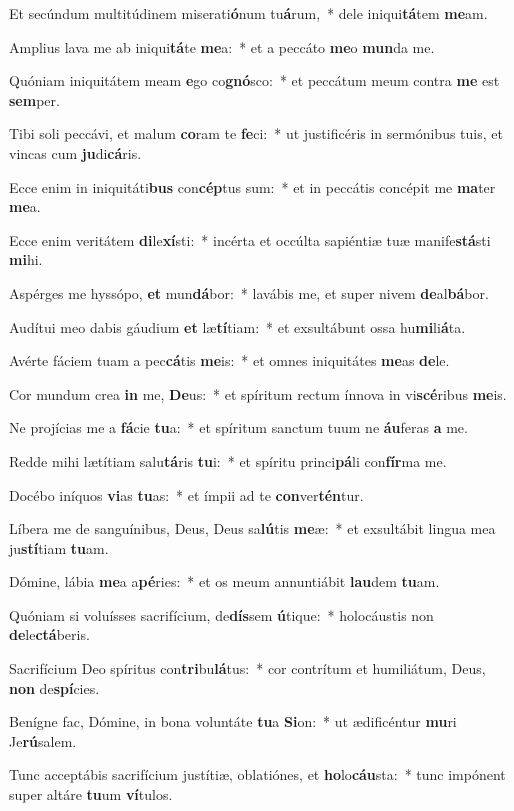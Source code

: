 \item Et secúndum multitúdinem miserati\textbf{ó}num tu\textbf{á}rum,~* dele iniqui\textbf{tá}tem \textbf{me}am.
\item Amplius lava me ab iniqui\textbf{tá}te \textbf{me}a:~* et a peccáto \textbf{me}o \textbf{mun}da me.
\item Quóniam iniquitátem meam \textbf{e}go co\textbf{gnó}sco:~* et peccátum meum contra \textbf{me} est \textbf{sem}per.
\item Tibi soli peccávi, et malum \textbf{co}ram te \textbf{fe}ci:~* ut justificéris in sermónibus tuis, et vincas cum \textbf{ju}di\textbf{cá}ris.
\item Ecce enim in iniquitáti\textbf{bus} con\textbf{cép}tus sum:~* et in peccátis concépit me \textbf{ma}ter \textbf{me}a.
\item Ecce enim veritátem \textbf{di}le\textbf{xí}sti:~* incérta et occúlta sapiéntiæ tuæ manife\textbf{stá}sti \textbf{mi}hi.
\item Aspérges me hyssópo, \textbf{et} mun\textbf{dá}bor:~* lavábis me, et super nivem \textbf{de}al\textbf{bá}bor.
\item Audítui meo dabis gáudium \textbf{et} læ\textbf{tí}tiam:~* et exsultábunt ossa hu\textbf{mi}li\textbf{á}ta.
\item Avérte fáciem tuam a pec\textbf{cá}tis \textbf{me}is:~* et omnes iniquitátes \textbf{me}as \textbf{de}le.
\item Cor mundum crea \textbf{in} me, \textbf{De}us:~* et spíritum rectum ínnova in vi\textbf{scé}ribus \textbf{me}is.
\item Ne projícias me a \textbf{fá}cie \textbf{tu}a:~* et spíritum sanctum tuum ne \textbf{áu}feras \textbf{a} me.
\item Redde mihi lætítiam salu\textbf{tá}ris \textbf{tu}i:~* et spíritu princi\textbf{pá}li con\textbf{fír}ma me.
\item Docébo iníquos \textbf{vi}as \textbf{tu}as:~* et ímpii ad te \textbf{con}ver\textbf{tén}tur.
\item Líbera me de sanguínibus, Deus, Deus sa\textbf{lú}tis \textbf{me}æ:~* et exsultábit lingua mea ju\textbf{stí}tiam \textbf{tu}am.
\item Dómine, lábia \textbf{me}a a\textbf{pé}ries:~* et os meum annuntiábit \textbf{lau}dem \textbf{tu}am.
\item Quóniam si voluísses sacrifícium, de\textbf{dís}sem \textbf{ú}tique:~* holocáustis non \textbf{de}le\textbf{ctá}beris.
\item Sacrifícium Deo spíritus con\textbf{tri}bu\textbf{lá}tus:~* cor contrítum et humiliátum, Deus, \textbf{non} de\textbf{spí}cies.
\item Benígne fac, Dómine, in bona voluntáte \textbf{tu}a \textbf{Si}on:~* ut ædificéntur \textbf{mu}ri Je\textbf{rú}salem.
\item Tunc acceptábis sacrifícium justítiæ, oblatiónes, et \textbf{ho}lo\textbf{cáu}sta:~* tunc impónent super altáre \textbf{tu}um \textbf{ví}tulos.
